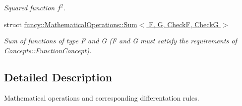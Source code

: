 \begin{DoxyCompactItemize}
\begin{DoxyCompactList}\small\item\em Squared function $f^2$. \end{DoxyCompactList}\item 
struct \hyperlink{structfuncy_1_1MathematicalOperations_1_1Sum}{funcy\-::\-Mathematical\-Operations\-::\-Sum$<$ F, G, Check\-F, Check\-G $>$}
\begin{DoxyCompactList}\small\item\em Sum of functions of type F and G (F and G must satisfy the requirements of \hyperlink{structfuncy_1_1Concepts_1_1FunctionConcept}{Concepts\-::\-Function\-Concept}). \end{DoxyCompactList}\end{DoxyCompactItemize}


\subsection{Detailed Description}
Mathematical operations and corresponding differentation rules. 